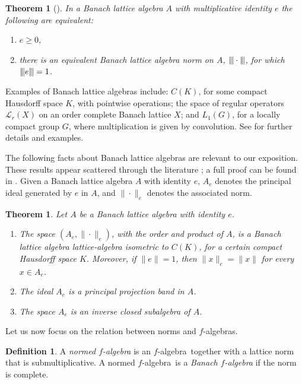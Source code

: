 \documentclass{memo-l}
\newtheorem{thm}[theorem]{Theorem}
\theoremstyle{definition}
\newtheorem{defn}[theorem]{Definition}
\theoremstyle{remark}
\numberwithin{section}{chapter}
\numberwithin{equation}{chapter}
\newcommand{\Lr}[1]{\ensuremath{\mathcal{L}_r(#1)}}
\newcommand{\falg}{$f\!$-algebra}
\newcommand{\trinor}[1]{{\vert\kern-0.25ex\vert\kern-0.25ex\vert #1 
    \vert\kern-0.25ex\vert\kern-0.25ex\vert}}
\begin{document}
\begin{thm}[{\cite[Theorem 2.2]{wickstead2017_questions}}]
    In a Banach lattice algebra $A$ with multiplicative identity $e$
    the following are equivalent:
    \begin{enumerate}
        \item $e\ge 0$,
        \item there is an equivalent Banach lattice algebra norm on
            $A$, $\trinor{\cdot }$, for which $\trinor{e}=1$.
    \end{enumerate}
\end{thm}

Examples of Banach lattice algebras include: $C(K)$, for some compact
Hausdorff space $K$, with pointwise operations; the space of regular
operators $\Lr X$ on an order complete Banach lattice $X$; and $L_1(G)$,
for a locally compact group $G$, where multiplication is given by
convolution. See \cite[Example 3.3]{munoz-lahoz2025} for further
details and examples.

The following facts about Banach lattice algebras are relevant
to our exposition. These results appear scattered through the literature
\cite{martignon1980,scheffold1984,huijsmans1995}; a full proof can be found in \cite[Theorem
3.4]{munoz-lahoz2025}. Given a Banach lattice algebra $A$ with
identity $e$, $A_e$ denotes the principal ideal generated by $e$
in $A$, and $\|{\cdot }\|_e$ denotes the associated norm.

\begin{thm}\label{thm:BLA}
    Let $A$ be a Banach lattice algebra with identity $e$.
    \begin{enumerate}
        \item The space $(A_e,\|{\cdot }\|_e)$, with the order and
            product of $A$, is a Banach lattice algebra lattice-algebra
            isometric to $C(K)$, for a certain compact Hausdorff space
            $K$. Moreover, if
            $\|e\|=1$, then $\|x\|_e=\|x\|$ for every $x \in A_e$.
        \item The ideal $A_e$ is a principal projection band in $A$.
        \item The space $A_e$ is an inverse closed subalgebra of $A$.
    \end{enumerate}
\end{thm}

Let us now focus on the relation between norms and \falg s.

\begin{defn}
    A \emph{normed \falg} is an \falg\ together with a lattice norm
    that is submultiplicative. A normed \falg\ is a \emph{Banach
    \falg} if the norm is complete.
\end{defn}
\end{document}
